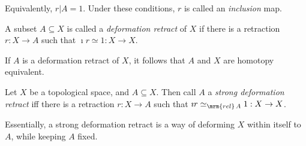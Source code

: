 \documentclass{fkbook}
\newcommand{\htop}[1][A]{\ensuremath\simeq_{\mrm{rel}\, #1}}
\begin{document}
\begin{adjustwidth}{1em}{1em}
\begin{definition}
    Equivalently, $r | A = 1$. Under these conditions, $r$ is called
    an \emph{inclusion} map.
  \end{definition}
  \begin{definition}
    A subset $A \subseteq X$ is called a \emph{deformation retract} of
    $X$ if there is a retraction $r : X \to A$ such that $\imath r
    \simeq 1 : X \to X$.
  \end{definition}
  If $A$ is a deformation retract of $X$, it follows that $A$ and $X$
  are homotopy equivalent.
  \begin{definition}
    Let $X$ be a topological space, and $A \subseteq X$. Then call $A$
    a \emph{strong deformation retract} iff there is a retraction $r :
    X \to A$ such that $\imath r \htop 1 : X \to X$.
  \end{definition}
  Essentially, a strong deformation retract is a way of deforming $X$
  within itself to $A$, while keeping $A$ fixed.
\end{adjustwidth}
\end{document}
